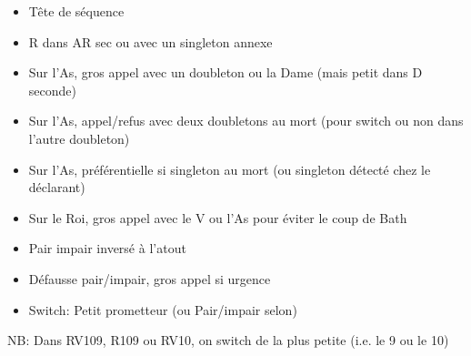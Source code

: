 \documentclass[a4paper, oneside, 11pt]{report}
\begin{document}
		\begin{itemize}
		\item Tête de séquence
		\item R dans AR sec ou avec un singleton annexe
		\item Sur l'As,  gros appel avec un doubleton ou la Dame (mais petit dans D seconde)
		\item Sur l'As,  appel/refus avec deux doubletons au mort (pour switch ou non dans l'autre doubleton)
		\item Sur l'As,  préférentielle si singleton au mort (ou singleton détecté chez le déclarant)
		\item Sur le Roi,  gros appel avec le V ou l'As pour éviter le coup de Bath
		\item Pair impair inversé à l'atout
		\item Défausse pair/impair,  gros appel si urgence
		\item Switch: Petit prometteur (ou Pair/impair selon)\\
		\end{itemize}
		NB: Dans RV109, R109 ou RV10,  on switch de la plus petite (i.e.  le 9 ou le 10)
\end{document}
